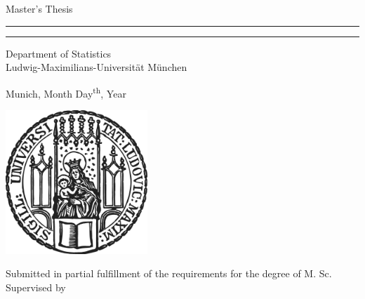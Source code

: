 \begin{titlepage}
\begin{center}

\LARGE
Master's Thesis
    
\vspace{0.5cm}
      
\rule{\textwidth}{1.5pt}
\LARGE
\textbf{\mytitle}
\rule{\textwidth}{1.5pt}
   
\vspace{0.5cm}
      
\large
Department of Statistics \\
Ludwig-Maximilians-Universität München 

\vfill

\Large
\textbf{\myname}

\vfill

\large
Munich, Month Day\textsuperscript{th}, Year
      
\vfill

\includegraphics[width = 0.4\textwidth]{sigillum.png}

\vfill

\normalsize
Submitted in partial fulfillment of the requirements for the degree of M. Sc.
\\

Supervised by \mysupervisor

\end{center}
\end{titlepage}
